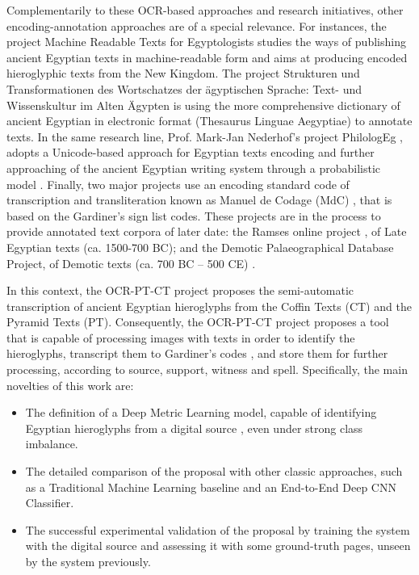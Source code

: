 \documentclass[10pt,onecolumn,letterpaper]{article}
\begin{document}
Complementarily to these OCR-based approaches and research initiatives, other encoding-annotation approaches are of a special relevance. For instances, the project Machine Readable Texts for Egyptologists \cite{Jauhiainen21} studies the ways of publishing ancient Egyptian texts in machine-readable form and aims at producing encoded hieroglyphic texts from the New Kingdom. The project Strukturen und Transformationen des Wortschatzes der ägyptischen Sprache: Text- und Wissenskultur im Alten Ägypten \cite{topmann21} is using the more comprehensive dictionary of ancient Egyptian in electronic format (Thesaurus Linguae Aegyptiae) to annotate texts. In the same research line, Prof. Mark-Jan Nederhof’s project PhilologEg \cite{Nederhof02}, adopts a Unicode-based approach for Egyptian texts encoding and further approaching of the ancient Egyptian writing system through a probabilistic model \cite{nederhof2017}. Finally, two major projects use an encoding standard code of transcription and transliteration known as Manuel de Codage (MdC) \cite{Buurman88, Grimal00}, that is based on the Gardiner’s sign list codes. These projects are in the process to provide annotated text corpora of later date: the Ramses online project \cite{polis2015, winand2015}, of Late Egyptian texts (ca. 1500-700 BC); and the Demotic Palaeographical Database Project, of Demotic texts (ca. 700 BC – 500 CE) \cite{Quack23}.

In this context, the OCR-PT-CT project \cite{Gracia22a} proposes the semi-automatic transcription of ancient Egyptian hieroglyphs from the Coffin Texts (CT) and the Pyramid Texts (PT). Consequently, the OCR-PT-CT project proposes a tool that is capable of processing images with texts in order to identify the hieroglyphs, transcript them to Gardiner’s codes \cite{Buurman88}, and store them for further processing, according to source, support, witness and spell. Specifically, the main novelties of this work are:

\begin{itemize}
	\item The definition of a Deep Metric Learning model, capable of identifying Egyptian hieroglyphs from a digital source \cite{Buck61}, even under strong class imbalance.
	\item The detailed comparison of the proposal with other classic approaches, such as a Traditional Machine Learning baseline and an End-to-End Deep CNN Classifier.
	\item The successful experimental validation of the proposal by training the system with the digital source \cite{Buck61} and assessing it with some ground-truth pages, unseen by the system previously.
\end{itemize}
\end{document}
